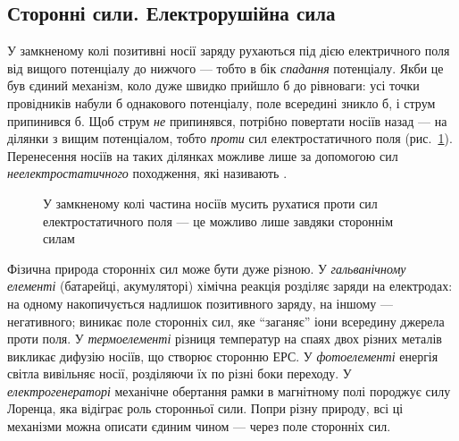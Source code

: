 \subsection*{Сторонні сили. Електрорушійна сила}\label{sec:EMF}

У замкненому колі позитивні носії заряду рухаються під дією електричного поля від вищого потенціалу до нижчого --- тобто в бік
\emph{спадання} потенціалу. Якби це був єдиний механізм, коло дуже швидко прийшло б до рівноваги: усі точки провідників набули б
однакового потенціалу, поле всередині зникло б, і струм припинився б. Щоб струм \emph{не} припинявся, потрібно повертати носіїв
назад --- на ділянки з вищим потенціалом, тобто \emph{проти} сил електростатичного поля (рис.~\ref{pic:CurrentSpheres}). Перенесення
носіїв на таких ділянках можливе лише за допомогою сил \emph{неелектростатичного} походження, які називають .

\begin{figure}\centering
	\caption{У замкненому колі частина носіїв мусить рухатися проти сил електростатичного поля --- це
		можливо лише завдяки стороннім силам\label{pic:CurrentSpheres}}
\end{figure}

Фізична природа сторонніх сил може бути дуже різною. У \emph{гальванічному елементі} (батарейці, акумуляторі) хімічна реакція
розділяє заряди на електродах: на одному накопичується надлишок позитивного заряду, на іншому --- негативного; виникає поле
сторонніх сил, яке \enquote{заганяє} іони всередину джерела проти поля. У \emph{термоелементі} різниця температур на спаях двох різних
металів викликає дифузію носіїв, що створює сторонню ЕРС. У \emph{фотоелементі} енергія світла вивільняє носії, розділяючи їх по
різні боки переходу. У \emph{електрогенераторі} механічне обертання рамки в магнітному полі породжує силу Лоренца, яка відіграє
роль сторонньої сили. Попри різну природу, всі ці механізми можна описати єдиним чином --- через поле сторонніх сил.

